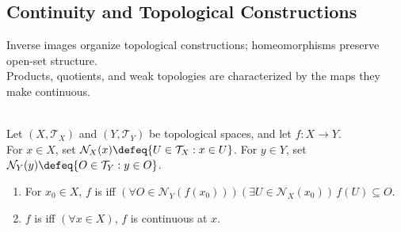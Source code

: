 \subsection{Continuity and Topological Constructions}

Inverse images organize topological constructions; homeomorphisms preserve open-set structure.\\
Products, quotients, and weak topologies are characterized by the maps they make continuous.

\begin{definition} \label{def:topological-continuity} \\
Let $(X,\mathcal{T}_X)$ and $(Y,\mathcal{T}_Y)$ be topological spaces, and let $f:X\to Y$.\\
For $x\in X$, set $\mathcal{N}_X(x)\defeq\{U\in\mathcal{T}_X:x\in U\}$. For $y\in Y$, set $\mathcal{N}_Y(y)\defeq\{O\in\mathcal{T}_Y:y\in O\}$.
\begin{enumerate}[label=(\roman*)]
\setlength{\itemsep}{0pt}
\item For $x_0\in X$, $f$ is  iff $(\forall O\in\mathcal{N}_Y(f(x_0)))(\exists U\in\mathcal{N}_X(x_0))\,f(U)\subseteq O$.
\item $f$ is  iff $(\forall x\in X)$, $f$ is continuous at $x$.
\end{enumerate}
\end{definition}

